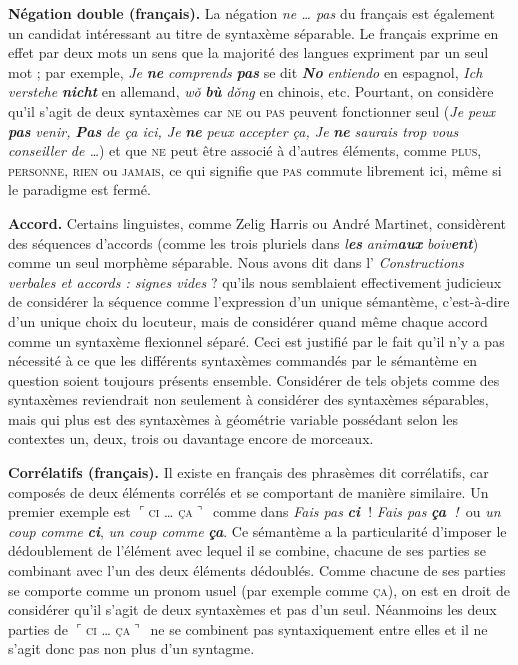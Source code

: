 {    \textbf{Négation double (français).} La négation \textit{ne … pas} du français est également un candidat intéressant au titre de syntaxème séparable. Le français exprime en effet par deux mots un sens que la majorité des langues expriment par un seul mot ; par exemple, \textit{Je} \textbf{\textit{ne}} \textit{comprends} \textbf{\textit{pas}} se dit \textbf{\textit{No}} \textit{entiendo} en espagnol, \textit{Ich verstehe} \textbf{\textit{nicht}} en allemand, \textit{wǒ} \textbf{\textit{bù}} \textit{dǒng} en chinois, etc. Pourtant, on considère qu’il s’agit de deux syntaxèmes car \textsc{ne} ou \textsc{pas} peuvent fonctionner seul (\textit{Je peux} \textbf{\textit{pas}} \textit{venir,} \textbf{\textit{Pas}} \textit{de ça ici, Je} \textbf{\textit{ne}} \textit{peux accepter ça, Je} \textbf{\textit{ne}} \textit{saurais trop vous conseiller de …}) et que \textsc{ne} peut être associé à d’autres éléments, comme \textsc{plus,} \textsc{personne,} \textsc{rien} ou \textsc{jamais}, ce qui signifie que \textsc{pas} commute librement ici, même si le paradigme est fermé.

    \textbf{Accord.} Certains linguistes, comme Zelig Harris ou André Martinet, considèrent des séquences d’accords (comme les trois pluriels dans \textit{l}\textbf{\textit{es} }\textit{anim}\textbf{\textit{aux}} \textit{boiv}\textbf{\textit{ent}}) comme un seul morphème séparable. Nous avons dit dans l’ \textit{Constructions verbales et accords : signes vides} ? qu’ils nous semblaient effectivement judicieux de considérer la séquence comme l’expression d’un unique sémantème, c’est-à-dire d’un unique choix du locuteur, mais de considérer quand même chaque accord comme un syntaxème flexionnel séparé. Ceci est justifié par le fait qu’il n’y a pas nécessité à ce que les différents syntaxèmes commandés par le sémantème en question soient toujours présents ensemble. Considérer de tels objets comme des syntaxèmes reviendrait non seulement à considérer des syntaxèmes séparables, mais qui plus est des syntaxèmes à géométrie variable possédant selon les contextes un, deux, trois ou davantage encore de morceaux.

    \textbf{Corrélatifs (français).} Il existe en français des phrasèmes dit corrélatifs, car composés de deux éléments corrélés et se comportant de manière similaire. Un premier exemple est \textrm{$⌜$}\textsc{ci} \textsc{…} \textsc{ça}\textrm{$⌝$}~comme dans \textit{Fais pas} \textbf{\textit{ci~}}! \textit{Fais pas} \textbf{\textit{ça~}}\textit{!~}ou \textit{un coup comme} \textbf{\textit{ci}}, \textit{un coup comme} \textbf{\textit{ça}}. Ce sémantème a la particularité d’imposer le dédoublement de l’élément avec lequel il se combine, chacune de ses parties se combinant avec l’un des deux éléments dédoublés. Comme chacune de ses parties se comporte comme un pronom usuel (par exemple comme \textsc{ça}), on est en droit de considérer qu’il s’agit de deux syntaxèmes et pas d’un seul. Néanmoins les deux parties de \textrm{$⌜$}\textsc{ci} \textsc{…} \textsc{ça}\textrm{$⌝$}~ne se combinent pas syntaxiquement entre elles et il ne s’agit donc pas non plus d’un syntagme.

}
